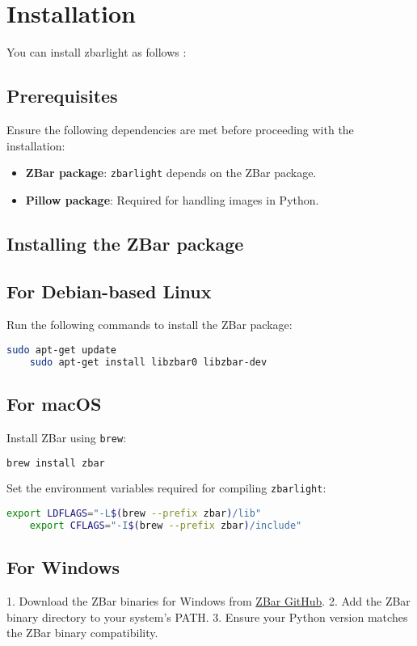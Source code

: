 \section{Installation}

You can install zbarlight as follows \cite{zbarlightpypi:2024}: 

\subsection{Prerequisites}
Ensure the following dependencies are met before proceeding with the installation:
\begin{itemize}
	\item \textbf{ZBar package}: \texttt{zbarlight} depends on the ZBar package.
	\item \textbf{Pillow package}: Required for handling images in Python.
\end{itemize}

\subsection{Installing the ZBar package}

\subsection{For Debian-based Linux}
Run the following commands to install the ZBar package:
\begin{lstlisting}[language=bash]
	sudo apt-get update
	sudo apt-get install libzbar0 libzbar-dev
\end{lstlisting}

\subsection{For macOS}
Install ZBar using \texttt{brew}:
\begin{lstlisting}[language=bash]
	brew install zbar
\end{lstlisting}

Set the environment variables required for compiling \texttt{zbarlight}:
\begin{lstlisting}[language=bash]
	export LDFLAGS="-L$(brew --prefix zbar)/lib"
	export CFLAGS="-I$(brew --prefix zbar)/include"
\end{lstlisting}

\subsection {For Windows}
1. Download the ZBar binaries for Windows from \href{https://github.com/mchehab/zbar}{ZBar GitHub}.
2. Add the ZBar binary directory to your system's PATH.
3. Ensure your Python version matches the ZBar binary compatibility.

